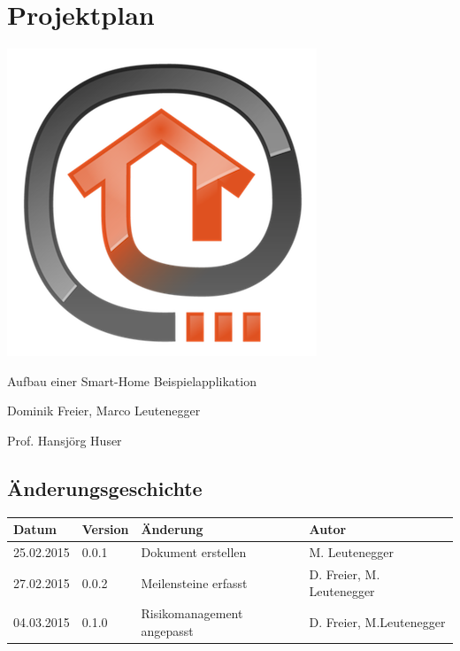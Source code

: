 \chapter{Projektplan}

\begin{center}
	\includegraphics[scale=0.75]{appendix/img/openhabLogo}
\end{center}
\vfill
\begin{description}[style=multiline,leftmargin=3cm]
\item[Thema] Aufbau einer Smart-Home Beispielapplikation
\item[Studenten] Dominik Freier, Marco Leutenegger
\item[Betreuer] Prof. Hansjörg Huser
\end{description}
\pagebreak

\section*{Änderungsgeschichte}
	\begin{tabularx}{\textwidth}{lllX}
		\textbf{Datum} & \textbf{Version} & \textbf{Änderung}	 & \textbf{Autor} 
		\\ \hline
			25.02.2015 &
			0.0.1 &
			Dokument erstellen &
			M. Leutenegger
		\\ \hline
			27.02.2015 &
			0.0.2 &
			Meilensteine erfasst	&
			D. Freier, M. Leutenegger
		\\ \hline
			04.03.2015 &
			0.1.0 &
			Risikomanagement angepasst &
			D. Freier, M.Leutenegger
		\\ \hline
	\end{tabularx}
\pagebreak

